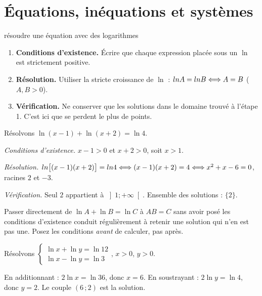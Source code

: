 \section{Équations, inéquations et systèmes}

\begin{methode}{résoudre une équation avec des logarithmes}
\begin{enumerate}[label=\textbf{\arabic*.}, leftmargin=*, itemsep=0.3em]
  \item \textbf{Conditions d'existence.} Écrire que chaque expression placée
        sous un $\ln$ est strictement positive.
  \item \textbf{Résolution.} Utiliser la stricte croissance de $\ln$ :
        $ln A = ln B \Longleftrightarrow A = B$ ($A,B>0$).
  \item \textbf{Vérification.} Ne conserver que les solutions dans le domaine
        trouvé à l'étape 1. C'est ici que se perdent le plus de points.
\end{enumerate}
\end{methode}

\begin{exemple}
Résolvons $\ln(x-1) + \ln(x+2) = \ln 4$.

\emph{Conditions d'existence.} $x-1>0$ et $x+2>0$, soit $x>1$.

\emph{Résolution.} $ln\bigl[(x-1)(x+2)\bigr] = ln 4 \Longleftrightarrow (x-1)(x+2)=4
\Longleftrightarrow x^{2}+x-6=0$, racines $2$ et $-3$.

\emph{Vérification.} Seul $2$ appartient à $\left]1;+\infty\right[$. Ensemble
des solutions : $\{2\}$.
\end{exemple}

\begin{erreurclassique}
Passer directement de $\ln A + \ln B = \ln C$ à $AB = C$ sans avoir posé les
conditions d'existence conduit régulièrement à retenir une solution qui n'en
est pas une. Posez les conditions \emph{avant} de calculer, pas après.
\end{erreurclassique}

\begin{exemple}
Résolvons
$\begin{cases} \ln x + \ln y = \ln 12 \\ \ln x - \ln y = \ln 3 \end{cases}$,
$x>0$, $y>0$.

En additionnant : $2\ln x = \ln 36$, donc $x = 6$. En soustrayant :
$2\ln y = \ln 4$, donc $y = 2$. Le couple $(6\,;2)$ est la solution.
\end{exemple}

